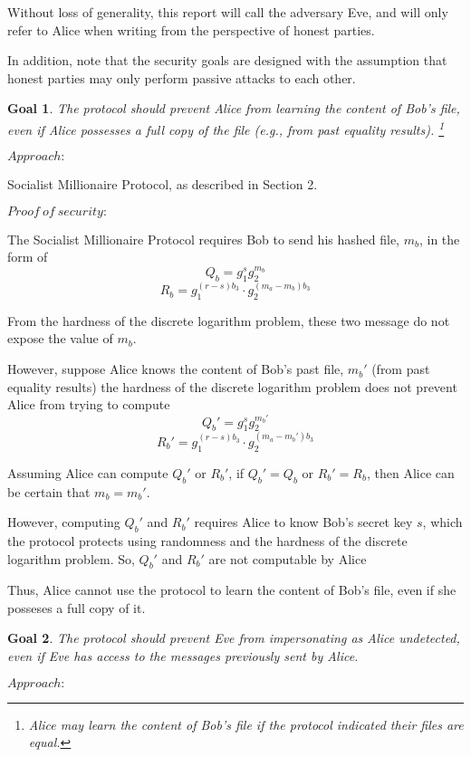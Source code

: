 \documentclass{article}
\newtheorem{goal}{Goal}
\begin{document}
Without loss of generality, this report will call the adversary Eve, and will only 
refer to Alice when writing from the perspective of honest parties. 

In addition, note that 
the security goals are designed with the assumption that honest parties may only
perform passive attacks to each other.

\begin{goal}
The protocol should prevent Alice from learning the content of Bob's file, even if 
Alice possesses a full copy of the file (e.g., from past equality results). 
\footnote{Alice may learn the content of Bob's file if the protocol indicated
their files are equal.}
\end{goal}

$Approach:$ 

Socialist Millionaire Protocol, as described in Section 2.

$Proof\ of\ security:$

The Socialist Millionaire Protocol requires Bob to send his hashed file, $m_b$, in the 
form of 
$$Q_b = g_1^sg_2^{m_b}$$ 
$$R_{b} = g_1^{(r-s)b_3} \cdot g_2^{(m_a-m_b)b_3}$$ 

From the hardness of the discrete logarithm problem, these two message do not expose 
the value of $m_b$.

However, suppose Alice knows the content of Bob's past file, $m_b'$ (from past equality 
results) the hardness of the discrete logarithm problem does not prevent Alice from 
trying to compute $$Q_b' = g_1^sg_2^{m_b'}$$
$$R_{b}' = g_1^{(r-s)b_3} \cdot g_2^{(m_a-m_b')b_3}$$ 

Assuming Alice can compute $Q_b'$ or $R_b'$, if $Q_b' = Q_b$ or $R_b' = R_b$, 
then Alice can be certain that $m_b = m_b'$.

However, computing $Q_b'$ and $R_b'$ requires Alice to know Bob's secret key $s$, which the 
protocol protects using randomness and the hardness of the discrete logarithm problem. So,
$Q_b'$ and $R_b'$ are not computable by Alice

Thus, Alice cannot use the protocol to learn the content of Bob's file, even if she posseses 
a full copy of it.

\begin{goal}
The protocol should prevent Eve from impersonating as Alice undetected, even if Eve 
has access to the messages previously sent by Alice.
\end{goal}

$Approach:$
\end{document}
